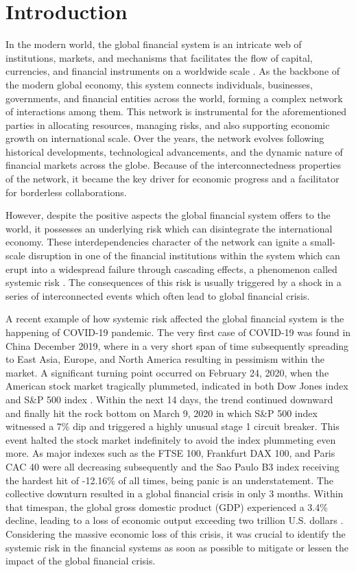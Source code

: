 \documentclass[a4paper,11pt]{article}
\begin{document}
\section{Introduction}
In the modern world, the global financial system is an intricate web of institutions, markets, and mechanisms that facilitates the flow of capital, currencies, and financial instruments on a worldwide scale \citep{Investopedia_2019}. As the backbone of the modern global economy, this system connects individuals, businesses, governments, and financial entities across the world, forming a complex network of interactions among them. This network is instrumental for the aforementioned parties in allocating resources, managing risks, and also supporting economic growth on international scale. Over the years, the network evolves following historical developments, technological advancements, and the dynamic nature of financial markets across the globe. Because of the interconnectedness properties of the network, it became the key driver for economic progress and a facilitator for borderless collaborations.

However, despite the positive aspects the global financial system offers to the world, it possesses an underlying risk which can disintegrate the international economy. These interdependencies character  of the network can ignite a small-scale disruption in one of the financial institutions within the system which can erupt into a widespread failure through cascading effects, a phenomenon  called systemic risk \citep{Allen_Carletti_2013}. The consequences of this risk is usually triggered by a shock in a series of interconnected events which often lead to global financial crisis.

A recent example of how systemic risk affected the global financial system is the happening of COVID-19 pandemic. The very first case of COVID-19 was found in China December 2019, where in a very short span of time subsequently spreading to East Asia, Europe, and North America resulting in pessimism within the market. A significant turning point occurred on February 24, 2020, when the American stock market tragically plummeted, indicated in both Dow Jones index and S\&P 500 index \citep{Statista_2024}. Within the next 14 days, the trend continued downward and finally hit the rock bottom on March 9, 2020 in which S\&P 500 index witnessed a 7\% dip and triggered a highly unusual stage 1 circuit breaker. This event halted the stock market indefinitely to avoid the index plummeting even more. As major indexes such as the FTSE 100, Frankfurt DAX 100, and Paris CAC 40 were all decreasing subsequently and the Sao Paulo B3 index receiving the hardest hit of -12.16\% of all times, being panic is an understatement. The collective downturn resulted in a global financial crisis in only 3 months. Within that timespan, the global gross domestic product (GDP) experienced a 3.4\% decline, leading to a loss of economic output exceeding two trillion U.S. dollars \citep{Dyvik_2024}. Considering the massive economic loss of this crisis, it was crucial to identify the systemic risk in the financial systems as soon as possible to mitigate or lessen the impact of the global financial crisis.
\end{document}
